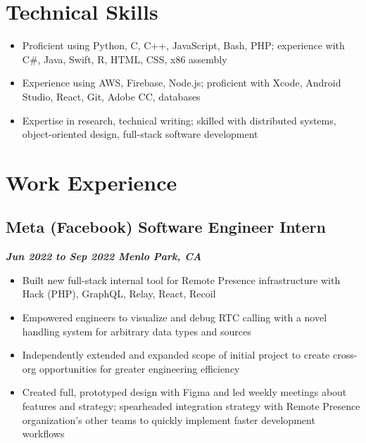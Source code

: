 \documentclass[10pt]{article}
\begin{document}
\begin{raggedright}
    \section*{Technical Skills}

        \begin{itemize}
            \item Proficient using Python, C, C++, JavaScript, Bash, PHP; experience with C\#, Java, Swift, R, HTML, CSS, x86 assembly
            \item Experience using AWS, Firebase, Node.js; proficient with Xcode, Android Studio, React, Git, Adobe CC, databases
            \item Expertise in research, technical writing; skilled with distributed systems, object-oriented design, full-stack software development
        \end{itemize}

    \section*{Work Experience}

	    \subsection*{\textbf{\large{Meta (Facebook) \textendash{} Software Engineer Intern}}} \hfill \textbf{\textit{Jun 2022 to Sep 2022 \textendash{} Menlo Park, CA}}
        \begin{itemize}
            \item Built new full-stack internal tool for Remote Presence infrastructure with Hack (PHP), GraphQL, Relay, React, Recoil
            \item Empowered engineers to visualize and debug RTC calling with a novel handling system for arbitrary data types and sources
            \item Independently extended and expanded scope of initial project to create cross-org opportunities for greater engineering efficiency
            \item Created full, prototyped design with Figma and led weekly meetings about features and strategy; spearheaded integration strategy with Remote Presence organization's other teams to quickly implement faster development workflows
        \end{itemize}


\end{raggedright}
\end{document}
